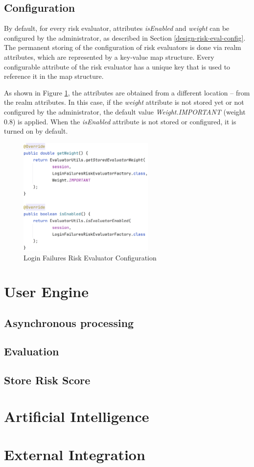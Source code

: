 \newpage
\subsection{Configuration}
By default, for every risk evaluator, attributes \textit{isEnabled} and \textit{weight} can be configured by the administrator, as described in Section \ref{design-risk-eval-config}.
The permanent storing of the configuration of risk evaluators is done via realm attributes, which are represented by a key-value map structure.
Every configurable attribute of the risk evaluator has a unique key that is used to reference it in the map structure.

As shown in Figure \ref{fig:impl-risk-evaluator-login-failures-config}, the attributes are obtained from a different location -- from the realm attributes.
In this case, if the \textit{weight} attribute is not stored yet or not configured by the administrator, the default value \textit{Weight.IMPORTANT} (weight 0.8) is applied.
When the \textit{isEnabled} attribute is not stored or configured, it is turned on by default.

\begin{figure}[htbp]
  \centering
  \includegraphics[width=0.6\textwidth]{img/sections/6-implementation/loginFailuresConfig.png}
  \caption{Login Failures Risk Evaluator Configuration}
  \label{fig:impl-risk-evaluator-login-failures-config}
\end{figure}

\newpage
\section{User Engine}
\subsection{Asynchronous processing}
\subsection{Evaluation}
\subsection{Store Risk Score}

\newpage
\section{Artificial Intelligence}

\newpage
\section{External Integration}

\shorthandoff{-}